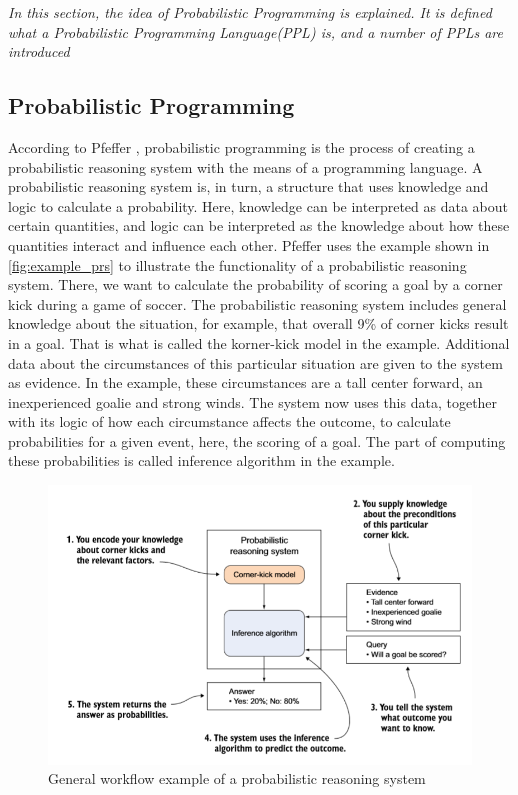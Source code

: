 \documentclass{article}
\begin{document}
\textit{In this section, the idea of Probabilistic Programming is explained. It is defined what a Probabilistic Programming Language(PPL) is, and a number of PPLs are introduced}

\subsection{Probabilistic Programming}
According to Pfeffer \cite{9781617292330}, probabilistic programming is the process of creating a probabilistic reasoning system with the means of a programming language. A probabilistic reasoning system is, in turn, a structure that uses knowledge and logic to calculate a probability. Here, knowledge can be interpreted as data about certain quantities, and logic can be interpreted as the knowledge about how these quantities interact and influence each other. Pfeffer \cite{9781617292330} uses the example shown in \autoref{fig:example_prs} to illustrate the functionality of a probabilistic reasoning system. There, we want to calculate the probability of scoring a goal by a corner kick during a game of soccer. The probabilistic reasoning system includes general knowledge about the situation, for example, that overall 9\% of corner kicks result in a goal. That is what is called the korner-kick model in the example. Additional data about the circumstances of this particular situation are given to the system as evidence. In the example, these circumstances are a tall center forward, an inexperienced goalie and strong winds. The system now uses this data, together with its logic of how each circumstance affects the outcome, to calculate probabilities for a given event, here, the scoring of a goal. The part of computing these probabilities is called inference algorithm in the example.
\begin{figure}
	\includegraphics[width=\textwidth]{images/probabilistic_reasoning_system.PNG}
	\caption[General workflow example of a probabilistic reasoning system. Source: \cite{9781617292330}]{General workflow example of a probabilistic reasoning system}
	\label{fig:example_prs}
\end{figure}
\end{document}
